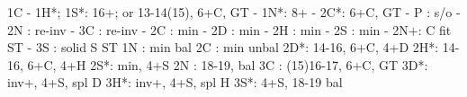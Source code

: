 1C - 1H*;
1S*: 16+; or 13-14(15), 6+C, GT
   - 1N*: 8+
        - 2C*: 6+C, GT
             - P  : s/o
             - 2N : re-inv
             - 3C : re-inv
   - 2C : min
   - 2D : min
   - 2H : min
   - 2S : min 
   - 2N+: C fit ST
   - 3S : solid S ST
1N : min bal
2C : min unbal
2D*: 14-16, 6+C, 4+D
2H*: 14-16, 6+C, 4+H 
2S*: min, 4+S
2N : 18-19, bal
3C : (15)16-17, 6+C, GT
3D*: inv+, 4+S, spl D
3H*: inv+, 4+S, spl H
3S*: 4+S, 18-19 bal
